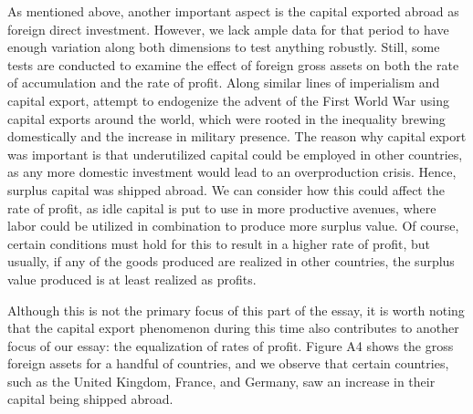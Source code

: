 \documentclass[10pt]{article}
\begin{document}
\par As mentioned above, another important aspect is the capital exported abroad as foreign direct investment. However, we lack ample data for that period to have enough variation along both dimensions to test anything robustly. Still, some tests are conducted to examine the effect of foreign gross assets on both the rate of accumulation and the rate of profit. Along similar lines of imperialism and capital export, \citet{hauner2017inequality} attempt to endogenize the advent of the First World War using capital exports around the world, which were rooted in the inequality brewing domestically and the increase in military presence. The reason why capital export was important is that underutilized capital could be employed in other countries, as any more domestic investment would lead to an overproduction crisis. Hence, surplus capital was shipped abroad. We can consider how this could affect the rate of profit, as idle capital is put to use in more productive avenues, where labor could be utilized in combination to produce more surplus value. Of course, certain conditions must hold for this to result in a higher rate of profit, but usually, if any of the goods produced are realized in other countries, the surplus value produced is at least realized as profits.
\par Although this is not the primary focus of this part of the essay, it is worth noting that the capital export phenomenon during this time also contributes to another focus of our essay: the equalization of rates of profit. Figure A4 shows the gross foreign assets for a handful of countries, and we observe that certain countries, such as the United Kingdom, France, and Germany, saw an increase in their capital being shipped abroad.
\end{document}
